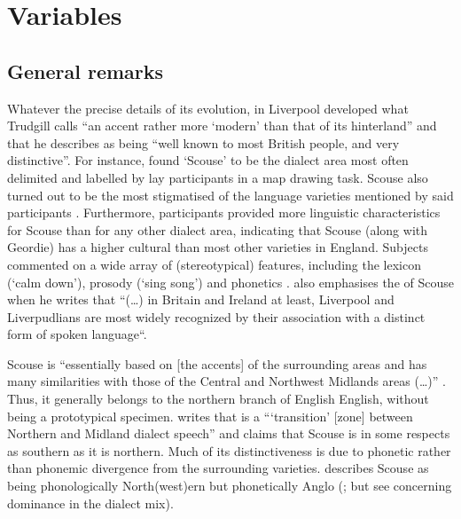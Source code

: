 \chapter{Variables}
\label{ch.var}

	\section{General remarks}\label{sec.var.general}

Whatever the precise details of its evolution, in Liverpool developed what Trud\-gill calls ``an accent rather more `modern' than that of its hinterland'' \citep[70]{trudgill1999} and that he describes as being ``well known to most British people, and very distinctive''.
For instance, \textcite{montgomery2007} found `Scouse' to be the dialect area most often delimited and labelled by lay participants in a map drawing task.
Scouse also turned out to be the most stigmatised of the language varieties mentioned by said participants \citep[cf.][194 and 254]{montgomery2007}.
Furthermore, participants provided more linguistic characteristics for Scouse than for any other dialect area, indicating that Scouse (along with Geordie) has a higher cultural  than most other varieties in England.
Subjects commented on a wide array of (stereotypical) features, including the lexicon (`calm down'), prosody (`sing song') and phonetics \citep[cf.][180--181]{montgomery2007a}.
\textcite[15]{crowley2012} also emphasises the  of Scouse when he writes that ``(\dots) in Britain and Ireland at least, Liverpool and Liverpudlians are most widely recognized by their association with a distinct form of spoken language``.

Scouse is ``essentially based on [the accents] of the surrounding areas and has many similarities with those of the Central  and Northwest Midlands areas (\dots)'' \citep[70]{trudgill1999}.
Thus, it generally belongs to the northern branch of English English, without being a prototypical specimen.
\citet[18]{wales2006} writes that  is a ```transition' [zone] between Northern and Midland dialect speech'' and \citet[72]{trudgill1999} claims that Scouse is in some respects as southern as it is northern.
Much of its distinctiveness is due to phonetic rather than phonemic divergence from the surrounding varieties. \textcite{knowles1973} describes Scouse as being phonologically North(west)ern but phonetically Anglo  (\citealt[cf. also][80]{knowles1978}; but see  concerning  dominance in the dialect mix).

